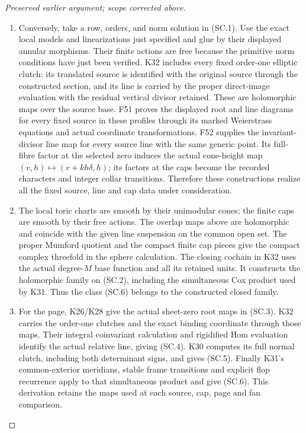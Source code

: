 \begin{proof}[Preserved earlier argument; scope corrected above]
\begin{enumerate}[label=\arabic*.]
\item Conversely, take a row, orders, and norm solution
in (SC.1). Use the exact local models and
linearizations just specified and glue by their
displayed annular morphisms. Their finite actions
are free because the primitive norm conditions
have just been verified. K32 includes every
fixed order-one elliptic clutch: its translated
source is identified with the original source
through the constructed section, and its line
is carried by the proper direct-image evaluation
with the residual vertical divisor retained.
These are holomorphic maps over the source base.
F51 proves the displayed root and line diagrams
for every fixed source in these profiles through
its marked Weierstrass equations and actual
coordinate transformations. F52 supplies the
invariant-divisor line map for every source line
with the same generic point. Its full-fibre
factor at the selected zero induces the actual
cone-height map
\((v,h)\mapsto(v+kh\delta,h)\); its factors at
the caps become the recorded characters and
integer collar transitions. Therefore these
constructions realize all the fixed source,
line and cap data under consideration.

\item The local toric charts are smooth by their
unimodular cones; the finite caps are smooth
by their free actions. The overlap maps above
are holomorphic and coincide with the given
line suspension on the common open set.
The proper Mumford quotient and the compact
finite cap pieces give the compact complex
threefold in the sphere calculation. The
closing cochain in K32 uses the actual
degree-\(M\) base function and all its retained
units. It constructs the holomorphic family
on (SC.2), including the simultaneous Cox
product used by K31. Thus the class (SC.6)
belongs to the constructed closed family.

\item For the page, K26/K28 give the actual
sheet-zero root maps in (SC.3). K32 carries
the order-one clutches and the exact
binding coordinate through those maps.
Their integral coinvariant calculation and
rigidified Hom evaluation identify the
actual relative line, giving (SC.4).
K30 computes its full normal clutch,
including both determinant signs, and
gives (SC.5). Finally K31's common-exterior
meridians, stable frame transitions and
explicit flop recurrence apply to that
simultaneous product and give (SC.6).
This derivation retains the maps used at
each source, cap, page and fan comparison.

\par


\end{enumerate}
\end{proof}

